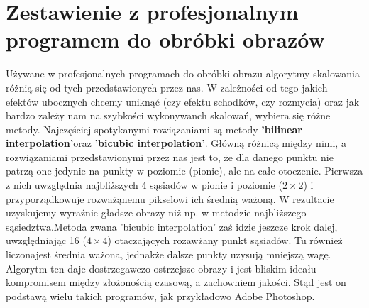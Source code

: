 \section{Zestawienie z profesjonalnym programem do obróbki obrazów}
Używane w profesjonalnych programach do obróbki obrazu algorytmy skalowania
różnią się od tych przedstawionych przez nas. W zależności od tego jakich
efektów ubocznych chcemy uniknąć (czy efektu schodków, czy rozmycia) oraz jak
bardzo zależy nam na szybkości wykonywanch skalowań, wybiera się różne metody.
Najczęściej spotykanymi rowiązaniami są metody
\textbf{'bilinear interpolation'}oraz \textbf{'bicubic interpolation'}.
Główną różnicą między nimi, a
rozwiązaniami przedstawionymi przez nas jest to, że dla danego punktu nie
patrzą one jedynie na punkty w poziomie (pionie), ale na całe otoczenie.
Pierwsza z nich uwzględnia najbliższych 4 sąsiadów w pionie i poziomie
($2\times2$) i przyporządkowuje rozważąnemu pikselowi ich średnią ważoną.
W rezultacie uzyskujemy wyraźnie gładsze obrazy niż np. w metodzie
najbliższego sąsiedztwa.Metoda zwana 'bicubic interpolation' zaś idzie jeszcze krok dalej, uwzględniając 16 ($4\times4$) otaczających rozawżany punkt sąsiadów. Tu również
liczonajest średnia ważona, jednakże dalsze punkty uzysują mniejszą wagę.
Algorytm ten daje dostrzegawczo ostrzejsze obrazy i jest bliskim ideału
kompromisem między złożonością czasową, a zachowniem jakości. Stąd jest on
podstawą wielu takich programów, jak przykładowo Adobe Photoshop.

